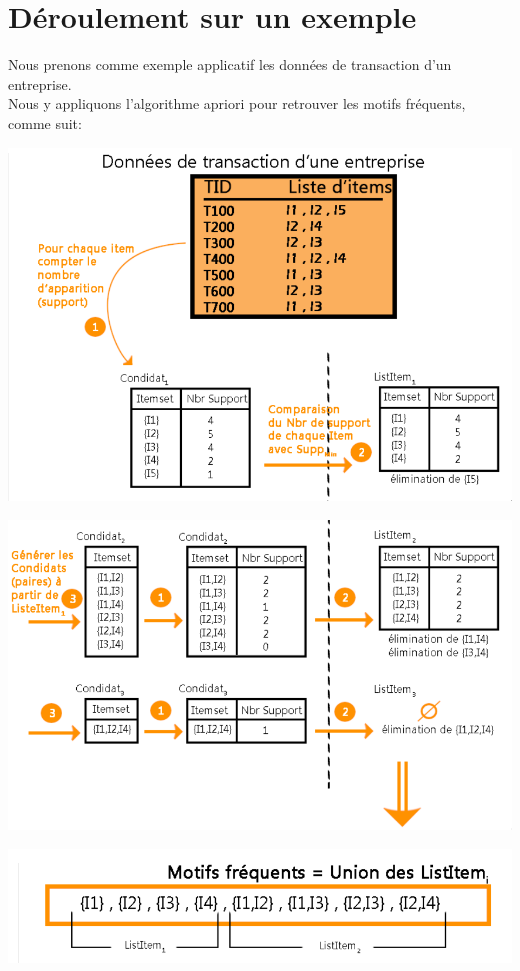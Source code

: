 \documentclass[12pt,a4paper,oneside]{book}
\begin{document}
\section{Déroulement sur un exemple}
Nous prenons comme exemple applicatif les données de transaction d'un entreprise.\\
Nous y appliquons l'algorithme apriori pour retrouver les motifs fréquents, comme suit:

\begin{center}
	\includegraphics[width=1\textwidth]{image/dm1.PNG}%
\end{center}
\begin{center}
	\includegraphics[width=1\textwidth]{image/dm2.PNG}%
\end{center}
\begin{center}
	\includegraphics[width=1\textwidth]{image/dm3.PNG}%
	\label{labelname}%
\end{center}
\end{document}
